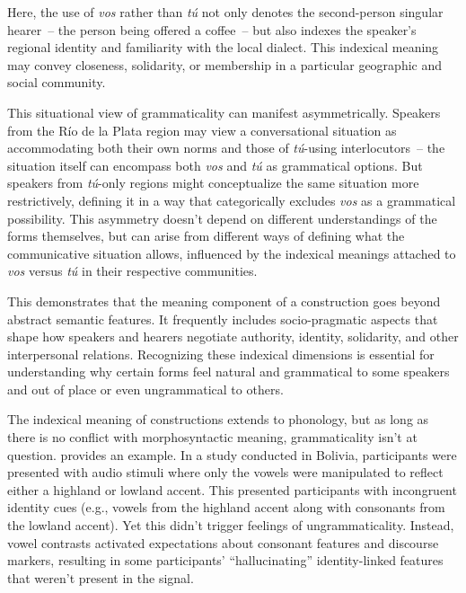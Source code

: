 Here, the use of \textit{vos} rather than \textit{tú} not only denotes the second-person singular hearer~-- the person being offered a coffee~-- but also indexes the speaker’s regional identity and familiarity with the local dialect. This indexical meaning may convey closeness, solidarity, or membership in a particular geographic and social community.

This situational view of grammaticality can manifest asymmetrically. Speakers from the Río de la Plata region may view a conversational situation as accommodating both their own norms and those of \textit{tú}-using interlocutors~-- the situation itself can encompass both \textit{vos} and \textit{tú} as grammatical options. But speakers from \textit{tú}-only regions might conceptualize the same situation more restrictively, defining it in a way that categorically excludes \textit{vos} as a grammatical possibility. This asymmetry doesn't depend on different understandings of the forms themselves, but can arise from different ways of defining what the communicative situation allows, influenced by the indexical meanings attached to \textit{vos} versus \textit{tú} in their respective communities.

This demonstrates that the meaning component of a construction goes beyond abstract semantic features. It frequently includes socio-pragmatic aspects that shape how speakers and hearers negotiate authority, identity, solidarity, and other interpersonal relations. Recognizing these indexical dimensions is essential for understanding why certain forms feel natural and grammatical to some speakers and out of place or even ungrammatical to others.

The indexical meaning of constructions extends to phonology, but as long as there is no conflict with morphosyntactic meaning, grammaticality isn't at question. \textcite{Babel2025} provides an example. In a study conducted in Bolivia, participants were presented with audio stimuli where only the vowels were manipulated to reflect either a highland or lowland accent. This presented participants with incongruent identity cues (e.g., vowels from the highland accent along with consonants from the lowland accent). Yet this didn't trigger feelings of ungrammaticality. Instead, vowel contrasts activated expectations about consonant features and discourse markers, resulting in some participants' \enquote{hallucinating} identity-linked features that weren't present in the signal.











